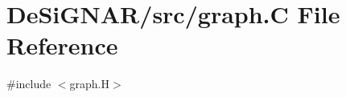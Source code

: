 \hypertarget{graph_8_c}{}\section{De\+Si\+G\+N\+A\+R/src/graph.C File Reference}
\label{graph_8_c}
{\ttfamily \#include $<$graph.\+H$>$}\newline
